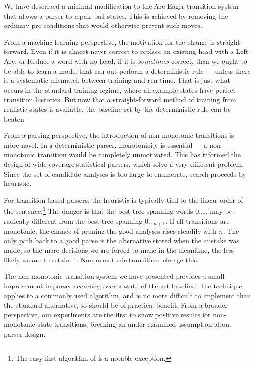 \documentclass[11pt,letterpaper]{article}
\begin{document}
We have described a minimal modification to the Arc-Eager transition system that
allows a parser to repair bad states. This is achieved by removing the ordinary
pre-conditions that would otherwise prevent such moves.

From a machine learning perspective, the motivation for the change is straight-forward.
Even if it is almost never correct to replace an existing head with a Left-Arc,
or Reduce a word with no head, if it is \emph{sometimes} correct, then we ought to be
able to learn a model that can out-perform a deterministic rule ---
unless there is a systematic mismatch between training and run-time.
That is just what occurs in the standard training regime, where all
example states
have perfect transition histories. But now that a straight-forward method of training
from realistic states is available, the baseline set by the deterministic
rule can be beaten.

From a parsing perspective, the introduction of non-monotonic transitions is more novel.
In a deterministic parser, monotonicity is essential --- a non-monotonic transition
would be completely unmotivated. This has informed the design of wide-coverage
statistical parsers, which solve a very different problem. Since the set of candidate
analyses is too large to enumerate, search proceeds by heuristic.

For transition-based parsers, the heuristic is typically tied to the linear order
of the sentence.\footnote{The easy-first algorithm of \citet{goldberg:11} is a
notable exception.} The danger is that the best tree spanning words $0..._n$ may
be radically different from the best tree spanning $0..._{n+1}$.
If all transitions are monotonic, the chance of pruning the good analyses rises
steadily with $n$. The only path back to a good parse is the alternative stored
when the mistake was made, so the more decisions we are forced to make in the meantime,
the less likely we are to retain it. Non-monotonic transitions change this.

The non-monotonic transition system we have presented provides a small improvement
in parser accuracy, over a state-of-the-art baseline. The technique applies to
a commonly used algorithm, and is no more difficult to implement than the standard
alternative, so should be of practical benefit. From a broader perspective, our
experiments are the first to show positive results for non-monotonic state transitions,
breaking an under-examined assumption about parser design.







\end{document}
